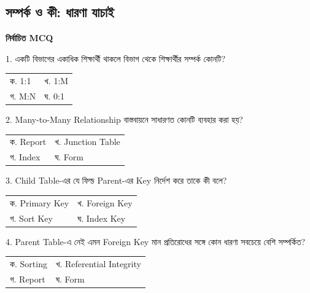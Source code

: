 \subsection{সম্পর্ক ও কী: ধারণা যাচাই}
\textbf{নির্বাচিত MCQ}
\begin{chSixSideBySide}[.48]
\small 1. একটি বিভাগের একাধিক শিক্ষার্থী থাকলে বিভাগ থেকে শিক্ষার্থীর সম্পর্ক কোনটি?

\par
\begin{tabularx}{\linewidth}{@{}Y Y@{}}
ক. 1:1 & খ. 1:M \\
গ. M:N & ঘ. 0:1 \\
\end{tabularx}
\smallskip
{}
\chSixNextColumn
\small 2. Many-to-Many Relationship বাস্তবায়নে সাধারণত কোনটি ব্যবহার করা হয়?

\par
\begin{tabularx}{\linewidth}{@{}Y Y@{}}
ক. Report & খ. Junction Table \\
গ. Index & ঘ. Form \\
\end{tabularx}
\smallskip
{}
\end{chSixSideBySide}
\begin{chSixSideBySide}[.48]
\small 3. Child Table-এর যে ফিল্ড Parent-এর Key নির্দেশ করে তাকে কী বলে?

\par
\begin{tabularx}{\linewidth}{@{}Y Y@{}}
ক. Primary Key & খ. Foreign Key \\
গ. Sort Key & ঘ. Index Key \\
\end{tabularx}
\smallskip
{}
\chSixNextColumn
\small 4. Parent Table-এ নেই এমন Foreign Key মান প্রতিরোধের সঙ্গে
কোন ধারণা সবচেয়ে বেশি সম্পর্কিত?

\par
\begin{tabularx}{\linewidth}{@{}Y Y@{}}
ক. Sorting & খ. Referential Integrity \\
গ. Report & ঘ. Form \\
\end{tabularx}
\smallskip
{}
\end{chSixSideBySide}


